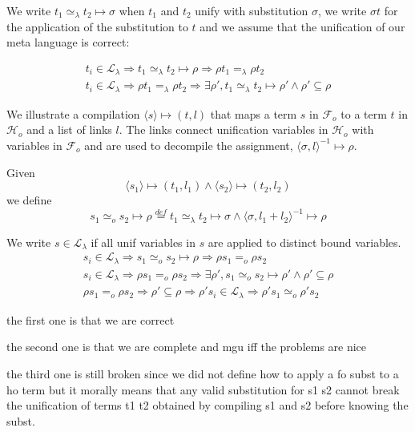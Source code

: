 \documentclass[sigconf,natbib=false]{acmart}
\newcommand{\EqualRel}{\ensuremath{=}}
\newcommand{\UnifRel}{\ensuremath{\simeq}}
\newcommand{\Uo}{\ensuremath{\UnifRel_o}\xspace}
\newcommand{\Eo}{\ensuremath{\EqualRel_o}\xspace}
\newcommand{\Ue}{\ensuremath{\UnifRel_\lambda}\xspace}
\newcommand{\Ee}{\ensuremath{\EqualRel_\lambda}\xspace}
\newcommand{\llambda}{\ensuremath{\mathcal{L}_\lambda}\xspace}
\newcommand{\Fo}{\ensuremath{\mathcal{F}_{\!o}\xspace}} %
\newcommand{\Ho}{\ensuremath{\mathcal{H}_o}\xspace}
\begin{document}
\newcommand{\unifcorrect}[3]{
    #3_i \in \llambda \Rightarrow
      #3_1 #2 #3_2 \mapsto \rho
        \Rightarrow 
          \rho #3_1 #1 \rho #3_2  %
}

\newcommand{\unifcomplete}[3]{
    #3_i \in \llambda \Rightarrow
        \rho #3_1 #1 \rho #3_2  %
          \Rightarrow \exists \rho', #3_1 #2 #3_2 \mapsto \rho' \land \rho' \subseteq \rho 
}

We write $t_1 \Ue t_2 \mapsto \sigma$ when $t_1$ and $t_2$ unify with substitution
$\sigma$, we write $\sigma t$ for the application of the substitution to
$t$ and we assume that the unification of our meta language is correct:

%
\begin{gather}
  \unifcorrect{\Ee}{\Ue}{t}\\
  \unifcomplete{\Ee}{\Ue}{t}
\end{gather}

\newcommand{\C}[3]{\ensuremath{\langle #1 \rangle}\mapsto(#2,#3)}
\newcommand{\D}[3]{\ensuremath{\langle #1,#2 \rangle^{-1}\mapsto #3}}

We illustrate a compilation $\C{s}{t}{l}$ that
maps a term $s$ in \Fo{} to a term $t$ in \Ho and a list of links $l$.
The links connect unification variables in \Ho with variables
in \Fo{} and are used to decompile the assignment,
$\D{\sigma}{l}{\rho}$.

Given 
$$
\C{s_1}{t_1}{l_1} \land \C{s_2}{t_2}{l_2}
$$
we define
$$
s_1 \Uo s_2 \mapsto \rho \stackrel{def}{=}
    t_1 \Ue t_2 \mapsto \sigma \land
    \D{\sigma}{l_1 + l_2}{\rho}
$$

We write $s \in \mathcal{L}_\lambda$ if all unif variables in
$s$ are applied to distinct bound variables.
%
\begin{gather}
\unifcorrect{\Eo}{\Uo}{s}\\
\unifcomplete{\Eo}{\Uo}{s}\\
  \rho s_1 \Eo \rho s_2 \Rightarrow
  \rho' \subseteq \rho \Rightarrow
  \rho's_i \in \mathcal{L}_\lambda \Rightarrow
  \rho' s_1 \Uo \rho' s_2
\end{gather}

the first one is that we are correct

the second one is that we are complete and mgu iff the problems are nice

the third one is still broken since we did not define how
to apply a fo subst to a ho term but it morally means
that any valid substitution for s1 s2 cannot break
the unification of terms t1 t2 obtained by compiling
s1 and s2 before knowing the subst.
\end{document}

